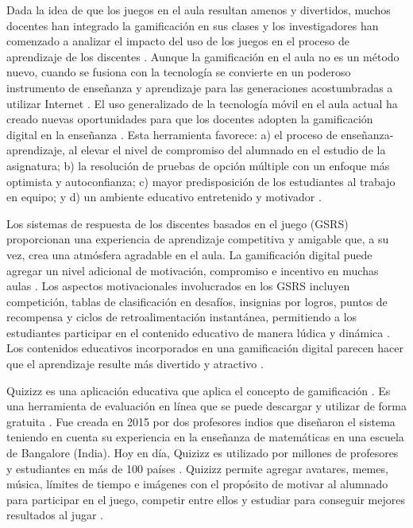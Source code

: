 \documentclass[spanish]{textolivre}
\begin{document}
Dada la idea de que los juegos en el aula resultan amenos y divertidos, muchos docentes han integrado la gamificación en sus clases y los investigadores han comenzado a analizar el impacto del uso de los juegos en el proceso de aprendizaje de los discentes \cite{mekler2017}. Aunque la gamificación en el aula no es un método nuevo, cuando se fusiona con la tecnología se convierte en un poderoso instrumento de enseñanza y aprendizaje para las generaciones acostumbradas a utilizar Internet \cite{bicen2018}. El uso generalizado de la tecnología móvil en el aula actual ha creado nuevas oportunidades para que los docentes adopten la gamificación digital en la enseñanza \cite{saleem2021}. Esta herramienta favorece: a) el proceso de enseñanza-aprendizaje, al elevar el nivel de compromiso del alumnado en el estudio de la asignatura; b) la resolución de pruebas de opción múltiple con un enfoque más optimista y autoconfianza; c) mayor predisposición de los estudiantes al trabajo en equipo; y d) un ambiente educativo entretenido y motivador \cite{vergara_rodriguez2019}.

Los sistemas de respuesta de los discentes basados en el juego (GSRS) proporcionan una experiencia de aprendizaje competitiva y amigable que, a su vez, crea una atmósfera agradable en el aula. La gamificación digital puede agregar un nivel adicional de motivación, compromiso e incentivo en muchas aulas \cite{doumanis2019, infante-villagran2021}. Los aspectos motivacionales involucrados en los GSRS incluyen competición, tablas de clasificación en desafíos, insignias por logros, puntos de recompensa y ciclos de retroalimentación instantánea, permitiendo a los estudiantes participar en el contenido educativo de manera lúdica y dinámica \cite{bottentuit2020, hanus2015}. Los contenidos educativos incorporados en una gamificación digital parecen hacer que el aprendizaje resulte más divertido y atractivo \cite{magadan-diaz2021}.

Quizizz es una aplicación educativa que aplica el concepto de gamificación \cite{pahamzah2020, zhao2019}. Es una herramienta de evaluación en línea que se puede descargar y utilizar de forma gratuita \cite{amalia2020}. Fue creada en 2015 por dos profesores indios que diseñaron el sistema teniendo en cuenta su experiencia en la enseñanza de matemáticas en una escuela de Bangalore (India). Hoy en día, Quizizz es utilizado por millones de profesores y estudiantes en más de 100 países \cite{andayani2021, bottentuit2020}. Quizizz permite agregar avatares, memes, música, límites de tiempo e imágenes con el propósito de motivar al alumnado para participar en el juego, competir entre ellos y estudiar para conseguir mejores resultados al jugar \cite{degirmenci2021, rahmawati2021, yunus2021, zuhriyah2020}.
\end{document}

